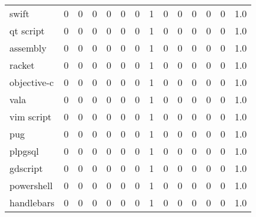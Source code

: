 \begin{tabular}{lrrrrrrrrrrrrr}
swift            &        0 &       0 &          0 &               0 &                0 &       0 &          1 &         0 &         0 &      0 &             0 &         0 &      1.0 \\
qt script        &        0 &       0 &          0 &               0 &                0 &       0 &          1 &         0 &         0 &      0 &             0 &         0 &      1.0 \\
assembly         &        0 &       0 &          0 &               0 &                0 &       0 &          1 &         0 &         0 &      0 &             0 &         0 &      1.0 \\
racket           &        0 &       0 &          0 &               0 &                0 &       0 &          1 &         0 &         0 &      0 &             0 &         0 &      1.0 \\
objective-c      &        0 &       0 &          0 &               0 &                0 &       0 &          1 &         0 &         0 &      0 &             0 &         0 &      1.0 \\
vala             &        0 &       0 &          0 &               0 &                0 &       0 &          1 &         0 &         0 &      0 &             0 &         0 &      1.0 \\
vim script       &        0 &       0 &          0 &               0 &                0 &       0 &          1 &         0 &         0 &      0 &             0 &         0 &      1.0 \\
pug              &        0 &       0 &          0 &               0 &                0 &       0 &          1 &         0 &         0 &      0 &             0 &         0 &      1.0 \\
plpgsql          &        0 &       0 &          0 &               0 &                0 &       0 &          1 &         0 &         0 &      0 &             0 &         0 &      1.0 \\
gdscript         &        0 &       0 &          0 &               0 &                0 &       0 &          1 &         0 &         0 &      0 &             0 &         0 &      1.0 \\
powershell       &        0 &       0 &          0 &               0 &                0 &       0 &          1 &         0 &         0 &      0 &             0 &         0 &      1.0 \\
handlebars       &        0 &       0 &          0 &               0 &                0 &       0 &          1 &         0 &         0 &      0 &             0 &         0 &      1.0 \\

\end{tabular}
